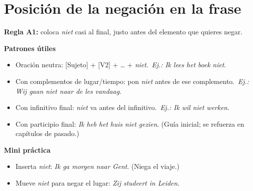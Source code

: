 \section{Posición de la negación en la frase}
\textbf{Regla A1:} coloca \textit{niet} casi al final, justo antes del elemento que quieres negar.

\textbf{Patrones útiles}
\begin{itemize}[leftmargin=*]
  \item Oración neutra: [Sujeto] + [V2] + \ldots{} + \textit{niet}.\ \textit{Ej.: Ik lees het boek niet}.
  \item Con complementos de lugar/tiempo: pon \textit{niet} antes de ese complemento.\ \textit{Ej.: Wij gaan niet naar de les vandaag}.
  \item Con infinitivo final: \textit{niet} va antes del infinitivo.\ \textit{Ej.: Ik wil niet werken}.
  \item Con participio final: \textit{Ik heb het huis niet gezien}. (Guía inicial; se refuerza en capítulos de pasado.)
\end{itemize}

\textbf{Mini práctica}
\begin{itemize}[leftmargin=*]
  \item Inserta \textit{niet}: \textit{Ik ga morgen naar Gent}. (Niega el viaje.)
  \item Mueve \textit{niet} para negar el lugar: \textit{Zij studeert in Leiden}.
\end{itemize}
